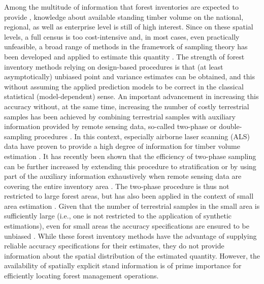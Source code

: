 Among the multitude of information that forest inventories are expected to provide \citep{mcroberts2010}, knowledge about available standing timber volume on the national, regional, as well as enterprise level is still of high interest. Since on these spatial levels, a full census is too cost-intensive and, in most cases, even practically unfeasible, a broad range of methods in the framework of sampling theory has been developed and applied to estimate this quantity \citep{gregoire2007, mandallaz2008, schreuder1993}. The strength of forest inventory methods relying on design-based procedures is that (at least asymptotically) unbiased point and variance estimates can be obtained, and this without assuming the applied prediction models to be correct in the classical statistical (model-dependent) sense. An important advancement in increasing this accuracy without, at the same time, increasing the number of costly terrestrial samples has been achieved by combining terrestrial samples with auxiliary information provided by remote sensing data, so-called two-phase or double-sampling procedures \citep{gregoire2007, mandallaz2008, cochran2007, kohl2006}. In this context, especially airborne laser scanning (ALS) data have proven to provide a high degree of information for timber volume estimation \citep{holmgren2004, naesset2002, naesset2007}. It has recently been shown that the efficiency of two-phase sampling can be further increased by extending this procedure to stratification \citep{saborowski2010, vonluepke2013} or by using part of the auxiliary information exhaustively when remote sensing data are covering the entire inventory area \citep{mandallaz2013b}. The two-phase procedure is thus not restricted to large forest areas, but has also been applied in the context of small area estimation \citep{breidenbach2012}. Given that the number of terrestrial samples in the small area is sufficiently large (i.e., one is not restricted to the application of synthetic estimations), even for small areas the accuracy specifications are ensured to be unbiased \citep{mandallaz2013a}. While these forest inventory methods have the advantage of supplying reliable accuracy specifications for their estimates, they do not provide information about the spatial distribution of the estimated quantity. However, the availability of spatially explicit stand information is of prime importance for efficiently locating forest management operations.\par
